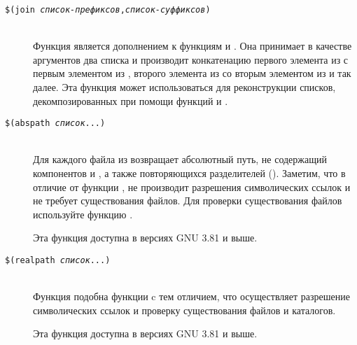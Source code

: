 \begin{description}
\item[\texttt{\${}(join \emph{список-префиксов},\emph{список-суффиксов})}] \hfill \\
Функция  является дополнением к функциям 
и . Она принимает в качестве аргументов два списка и
производит конкатенацию первого элемента из
 с первым элементом из
, второго элемента из
 со вторым элементом из
 и так далее. Эта функция может
использоваться для реконструкции списков, декомпозированных при помощи
функций  и .

\item[\texttt{\${}(abspath \emph{список}...)}] \hfill \\
Для каждого файла из  возвращает абсолютный путь,
не содержащий компонентов  и , а также
повторяющихся разделителей (\filename{/}). Заметим, что в отличие от
функции ,  не производит
разрешения символических ссылок и не требует существования файлов.
Для проверки существования файлов используйте функцию
.

Эта функция доступна в версиях GNU \GNUmake{} 3.81 и выше.

\item[\texttt{\${}(realpath \emph{список}...)}] \hfill \\
Функция  подобна функции  c тем
отличием, что осуществляет разрешение символических ссылок и проверку
существования файлов и каталогов.

Эта функция доступна в версиях GNU \GNUmake{} 3.81 и выше.
\end{description}

